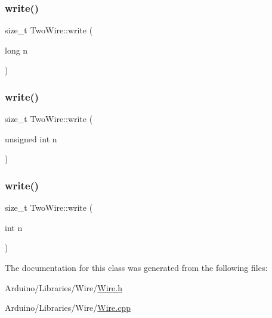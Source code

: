\mbox{\label{class_two_wire_a55a9894186458e43852f6fb7c59bb066}} 
\subsubsection{\texorpdfstring{write()}{write()}\hspace{0.1cm}{\footnotesize\ttfamily [4/6]}}
{\footnotesize\ttfamily size\+\_\+t Two\+Wire\+::write (\begin{DoxyParamCaption}\item[{long}]{n }\end{DoxyParamCaption})\hspace{0.3cm}{\ttfamily [inline]}}

\mbox{\label{class_two_wire_afdb917746ee37f72e7452b4782e9527b}} 
\subsubsection{\texorpdfstring{write()}{write()}\hspace{0.1cm}{\footnotesize\ttfamily [5/6]}}
{\footnotesize\ttfamily size\+\_\+t Two\+Wire\+::write (\begin{DoxyParamCaption}\item[{unsigned int}]{n }\end{DoxyParamCaption})\hspace{0.3cm}{\ttfamily [inline]}}

\mbox{\label{class_two_wire_a8ec34b0d2a75e8b2751eb9f4332bd7c3}} 
\subsubsection{\texorpdfstring{write()}{write()}\hspace{0.1cm}{\footnotesize\ttfamily [6/6]}}
{\footnotesize\ttfamily size\+\_\+t Two\+Wire\+::write (\begin{DoxyParamCaption}\item[{int}]{n }\end{DoxyParamCaption})\hspace{0.3cm}{\ttfamily [inline]}}



The documentation for this class was generated from the following files\+:\begin{DoxyCompactItemize}
\item 
Arduino/\+Libraries/\+Wire/\hyperlink{_wire_8h}{Wire.\+h}\item 
Arduino/\+Libraries/\+Wire/\hyperlink{_wire_8cpp}{Wire.\+cpp}\end{DoxyCompactItemize}
